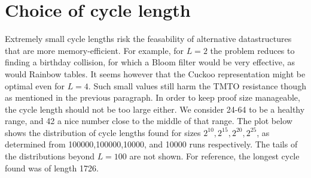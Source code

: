 \documentclass[11pt, oneside]{article}
\begin{document}
\section{Choice of cycle length}
Extremely small cycle lengths risk the feasability of alternative datastructures that
are more memory-efficient. For example, for $L=2$ the problem reduces to finding a birthday collision,
for which a Bloom filter would be very effective, as would Rainbow tables.
It seems however that the Cuckoo representation might be optimal even for $L=4$.
Such small values still harm the TMTO resistance though as mentioned in the previous paragraph.
In order to keep proof size manageable, the cycle length should not be too large either.
We consider 24-64 to be a healthy range, and 42 a nice number close to the middle of that range.
The plot below shows the distribution of cycle lengths found for sizes $2^{10},2^{15},2^{20},2^{25}$,
as determined from 100000,100000,10000, and 10000 runs respectively. The tails of the distributions
beyond $L=100$ are not shown. For reference, the longest cycle found was of length 1726.
\end{document}
